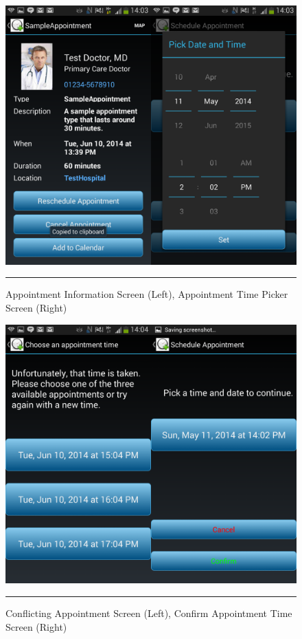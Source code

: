 \begin{figure}[htbp]
	\centering
\includegraphics[width=\textwidth,height=\textheight,keepaspectratio]{Figures/screens/AppointmentScheduleScreen.png}
		\rule{35em}{0.5pt}
	\caption[Appointment Information Screen (Left), Appointment Time Picker Screen (Right)]{Appointment Information Screen (Left), Appointment Time Picker Screen (Right)}
	\label{fig:appointmentschedulescreen}
\end{figure}

\begin{figure}[htbp]
	\centering
\includegraphics[width=\textwidth,height=\textheight,keepaspectratio]{Figures/screens/ConfirmScheduleScreen.png}
		\rule{35em}{0.5pt}
	\caption[Conflicting Appointment Screen (Left), Confirm Appointment Time Screen (Right)]{Conflicting Appointment Screen (Left), Confirm Appointment Time Screen (Right)}
	\label{fig:conflictappointscreen}
\end{figure}


